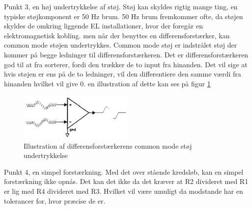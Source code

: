 Punkt 3, en høj undertrykkelse af støj. Støj kan skyldes rigtig mange ting, en typiske støjkomponent er 50 Hz brum. 50 Hz brum fremkommer ofte, da støjen skyldes de omkring liggende EL installationer, hvor der foregår en elektromagnetisk kobling. men når der benyttes en differensforstærker, kan common mode støjen undertrykkes. Common mode støj er indstrålet støj der kommer på begge ledninger til differensforstærkeren. Det er differensforstærkeren god til at fra sorterer, fordi den trækker de to input fra hinanden. Det vil sige at hvis støjen er ens på de to ledninger, vil den differentiere den samme værdi fra hinanden hvilket vil give 0. en illustration af dette kan ses på figur \ref{fig:differensNoise} 
\begin{figure}[H]
	\centering
	\includegraphics[width=0.5\textwidth]{billeder/Hardware/differensnoise.jpg}
	\caption{Illustration af differensforstærkerens common mode støj undertrykkelse}
	\label{fig:differensNoise}
\end{figure}

Punkt 4, en simpel forstærkning. Med det over stående kredsløb, kan en simpel forstærkning ikke opnås. Det kan det ikke da det kræver at R2 divideret med R1 er lig med R4 divideret med R3. Hvilket vil være umuligt da modstande har en tolerancer for, hvor præcise de er.

